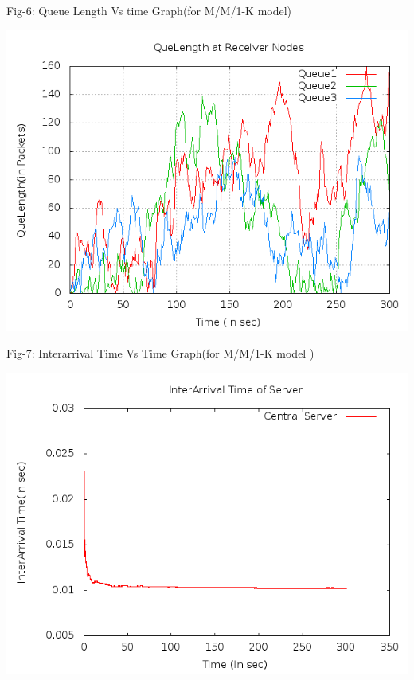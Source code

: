\documentclass[a4paper,12pt]{report}
\begin{document}
\noindent Fig-6: Queue Length Vs time Graph(for M/M/1-K model)
\begin{center}
 \includegraphics[width=12 cm,height=12 cm]{../problem1/queuelength.png}
\end{center}
\noindent Fig-7: Interarrival Time Vs Time Graph(for M/M/1-K model )\\
\begin{center}
 \includegraphics[width=12 cm,height=12 cm]{../problem1/interarrival.png}
\end{center}
\end{document}
